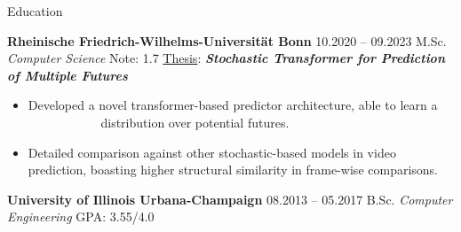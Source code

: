 \begin{rubric}{Education}


\entry*[]  \textbf{Rheinische Friedrich-Wilhelms-Universität Bonn} \hfill  10.2020 -- 09.2023   \newline
 M.Sc. \emph{Computer Science}  \hfill Note:  1.7 \newline
 \underline{Thesis}:  \hspace*{5mm} \textit{\textbf{Stochastic Transformer for Prediction of Multiple Futures}} \newline 
 \vspace{\CVItemizeHeaderSpacing} \begin{itemize}[rightmargin=1cm]
 	\setlength{\itemsep}{\CVItemizeSpacing}
 	\item Developed a novel transformer-based predictor architecture, able to learn a ~~~~~~~~~~~ distribution over potential futures.  
 	\item Detailed comparison against other stochastic-based models in video prediction, boasting higher structural similarity in frame-wise comparisons.
 \end{itemize}
\entry*[]  \textbf{University of Illinois Urbana-Champaign} \hfill  08.2013 -- 05.2017 \newline
B.Sc. \emph{Computer Engineering} \hfill GPA: 3.55/4.0 \newline %



\end{rubric}